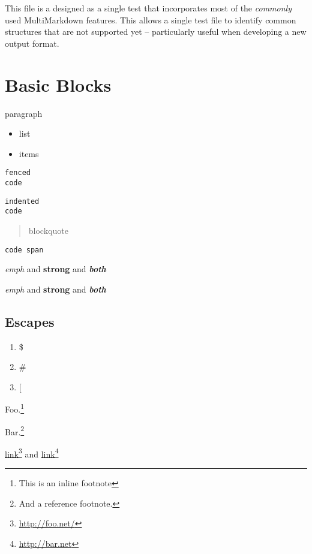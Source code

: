 This file is a designed as a single test that incorporates most of the
\emph{commonly} used MultiMarkdown features. This allows a single test file to
identify common structures that are not supported yet -- particularly useful
when developing a new output format.

\part{Basic Blocks }
\label{basicblocks}

paragraph

\begin{itemize}
\item list

\item items

\end{itemize}

\begin{verbatim}
fenced
code
\end{verbatim}

\begin{verbatim}
indented
code
\end{verbatim}

\begin{quote}
blockquote
\end{quote}

\texttt{code span}

\emph{emph} and \textbf{strong} and \textbf{\emph{both}}

\emph{emph} and \textbf{strong} and \textbf{\emph{both}}

\chapter{Escapes }
\label{escaped}

\begin{enumerate}
\item \$

\item \#

\item [

\end{enumerate}

Foo.\footnote{This is an inline footnote}

Bar.\footnote{And a reference footnote.}

\href{http://foo.net/}{link}\footnote{\href{http://foo.net/}{http:/\slash foo.net\slash }} and \href{http://bar.net}{link}\footnote{\href{http://bar.net}{http:/\slash bar.net}}

